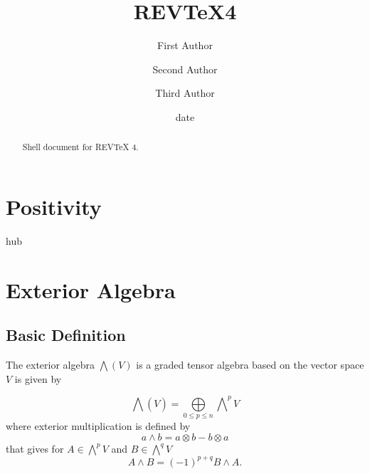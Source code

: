 \documentclass[aps,preprint]{revtex4}%
\begin{document}
\title[Short title for running header]{REV\TeX4}
\author{First Author}
\author{Second Author}
\author{Third Author}

\begin{abstract}
Shell document for REV\TeX{} 4.

\end{abstract}
\date[Date text]{date}




\maketitle
\tableofcontents


\section{Positivity}

hub

\section{Exterior Algebra}

\subsection{ Basic Definition}

The exterior algebra $%
{\textstyle\bigwedge}
\left(  V\right)  $ is a graded tensor algebra based on the vector space $V$
is given by%

\begin{equation}%
{\displaystyle\bigwedge}
\left(  \overset{}{V}\right)  \mathcal{=}%
{\displaystyle\bigoplus\limits_{0\leq p\leq n}}
{\displaystyle\bigwedge\nolimits^{p}}
V
\end{equation}
where exterior multiplication is defined by
\begin{equation}
a\wedge b=a\otimes b-b\otimes a
\end{equation}
that gives for $A\in%
{\textstyle\bigwedge\nolimits^{p}}
V$ and $B\in%
{\textstyle\bigwedge\nolimits^{q}}
V$
\begin{equation}
A\wedge B=\left(  -1\right)  ^{p+q}B\wedge A.
\end{equation}
\end{document}
